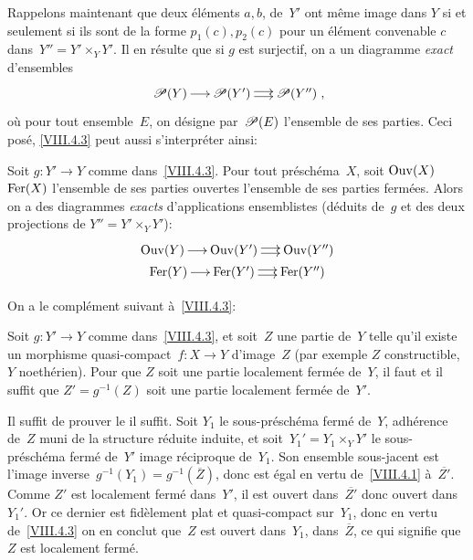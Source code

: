 Rappelons maintenant que deux \'el\'ements $a,b$, de~$Y'$ ont
m\^eme image dans $Y$ si et seulement si ils sont de la forme
$p_{1}(c),p_{2}(c)$ pour un \'el\'ement convenable $c$
dans~$Y''=Y'\times_{Y}Y'$. Il en r\'esulte que si $g$ est surjectif,
on a un diagramme \emph{exact} d'ensembles
$$
\xymatrix@C=.5cm{{\cal{P}(Y)}\ar[r]&{\cal{P}(Y')}\ar@<2pt>[r]\ar@<-2pt>[r]&{\cal{P}(Y'')}}\quoi,
$$
o\`u pour tout ensemble~$E$, on d\'esigne par~$\cal{P}(E)$
l'ensemble de ses parties. Ceci pos\'e, \ref{VIII.4.3} peut aussi
s'interpr\'eter ainsi:

\begin{corollaire}
\label{VIII.4.4}
Soit
$g\colon Y'{\to} Y$ comme dans~\ref{VIII.4.3}. Pour tout
pr\'esch\'ema~$X$, soit $\operatorname{Ouv}(X)$ \resp $\operatorname{Fer}(X)$ l'ensemble de
ses parties ouvertes \resp l'ensemble de ses parties
ferm\'ees. Alors on a des diagrammes \emph{exacts} d'applications
ensemblistes (d\'eduits de~$g$ et des deux projections de
$Y''=Y'\times_{Y}Y'$):
\vspace*{-5pt}
\begin{gather*}
\xymatrix@C=.5cm{{\mathrm{Ouv}(Y)}\ar[r]&{\mathrm{Ouv}(Y')}\ar@<2pt>[r]\ar@<-2pt>[r]&{\mathrm{Ouv}(Y'')}}\\[-3pt]
\xymatrix@C=.5cm{{\mathrm{Fer}(Y)}\ar[r]&{\mathrm{Fer}(Y')}\ar@<2pt>[r]\ar@<-2pt>[r]&{\mathrm{Fer}(Y'')}}
\end{gather*}
\end{corollaire}

On a le compl\'ement suivant \`a~\ref{VIII.4.3}:

\begin{corollaire}
\label{VIII.4.5}
Soit $g\colon Y'\to Y$ comme dans~\ref{VIII.4.3}, et soit~$Z$ une
partie de~$Y$ telle qu'il existe un morphisme quasi-compact~$f\colon
X\to Y$ d'image~$Z$ (par exemple $Z$ constructible, $Y$
noeth\'erien). Pour que $Z$ soit une partie localement ferm\'ee
de~$Y$, il faut et il suffit que $Z'=g^{-1}(Z)$ soit une partie
localement ferm\'ee de~$Y'$.
\end{corollaire}

Il suffit de prouver le \og il suffit\fg. Soit $Y_{1}$ le
sous-pr\'esch\'ema ferm\'e de~$Y$, adh\'erence de~$Z$ muni de
la structure r\'eduite induite, et soit~$Y_{1}'=Y_{1}\times_{Y}Y'$
le sous-pr\'esch\'ema ferm\'e de~$Y'$ image r\'eciproque
de~$Y_{1}$. Son ensemble sous-jacent est l'image
inverse~$g^{-1}(Y_{1})=g^{-1}(\overline{Z})$, donc est \'egal en
vertu de~\ref{VIII.4.1} \`a~$\overline{Z'}$. Comme $Z'$ est
localement ferm\'e dans~$Y'$, il est ouvert dans~$\overline{Z'}$
donc ouvert dans~$Y_{1}'$. Or ce dernier est fid\`element plat et
quasi-compact sur~$Y_{1}$, donc en vertu de~\ref{VIII.4.3} on en
conclut que~$Z$ est ouvert dans~$Y_{1}$, \ie dans~$\overline{Z}$, ce
qui signifie que $Z$ est localement ferm\'e.

